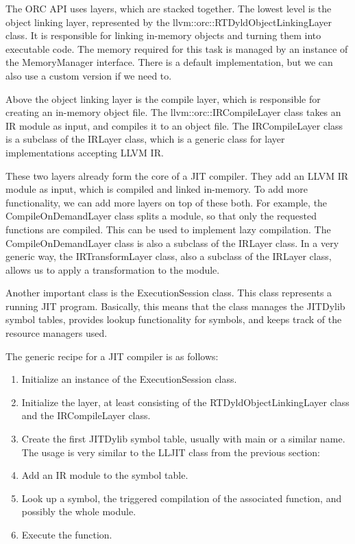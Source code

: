 The ORC API uses layers, which are stacked together. The lowest level is the object linking layer, represented by the llvm::orc::RTDyldObjectLinkingLayer class. It is responsible for linking in-memory objects and turning them into executable code. The memory required for this task is managed by an instance of the MemoryManager interface. There is a default implementation, but we can also use a custom version if we need to.\par

Above the object linking layer is the compile layer, which is responsible for creating an in-memory object file. The llvm::orc::IRCompileLayer class takes an IR module as input, and compiles it to an object file. The IRCompileLayer class is a subclass of the IRLayer class, which is a generic class for layer implementations accepting LLVM IR.\par

These two layers already form the core of a JIT compiler. They add an LLVM IR module as input, which is compiled and linked in-memory. To add more functionality, we can add more layers on top of these both. For example, the CompileOnDemandLayer class splits a module, so that only the requested functions are compiled. This can be used to implement lazy compilation. The CompileOnDemandLayer class is also a subclass of the IRLayer class. In a very generic way, the IRTransformLayer class, also a subclass of the IRLayer class, allows us to apply a transformation to the module.\par

Another important class is the ExecutionSession class. This class represents a running JIT program. Basically, this means that the class manages the JITDylib symbol tables, provides lookup functionality for symbols, and keeps track of the resource managers used.\par

The generic recipe for a JIT compiler is as follows:\par

\begin{enumerate}
\item Initialize an instance of the ExecutionSession class.
\item Initialize the layer, at least consisting of the RTDyldObjectLinkingLayer class and the IRCompileLayer class.
\item Create the first JITDylib symbol table, usually with main or a similar name.
\\The usage is very similar to the LLJIT class from the previous section:
\item Add an IR module to the symbol table.
\item Look up a symbol, the triggered compilation of the associated function, and possibly the whole module.
\item Execute the function.
\end{enumerate}

